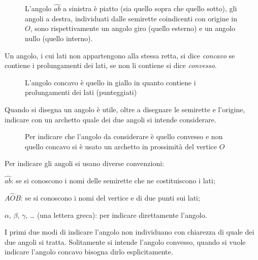 \begin{inaccessibleblock}
 \begin{figure}[bth]
 \centering 
 \caption{L'angolo  $\widehat{ab}$ a sinistra è piatto (sia quello 
sopra che quello sotto), gli angoli a destra, individuati dalle 
semirette coindicenti con origine in $O$, sono rispettivamente un 
angolo giro (quello esterno) e un angolo nullo (quello 
interno).}\label{fig:1.19}
\end{figure}
\end{inaccessibleblock}

\begin{definizione}
Un angolo, i cui lati non appartengono alla stessa retta, si dice 
\emph{concavo} se contiene i prolungamenti dei lati, se non li 
contiene si dice \emph{convesso}.
\end{definizione}

\begin{figure*}[htb]
\centering  
\caption{L'angolo concavo è quello in giallo in quanto contiene i 
prolungamenti dei lati (punteggiati)}\label{fig:1.20}
\end{figure*}

Quando si disegna un angolo è utile, oltre a disegnare le semirette e 
l'origine, indicare con un archetto quale dei due angoli si intende 
considerare.


\begin{inaccessibleblock}
 \begin{figure}[htb]
 \centering 
\caption{Per indicare che l'angolo da considerare è quello convesso e 
non quello concavo si è usato un archetto in prossimità del vertice 
$O$}\label{fig:1.21}
\end{figure}
\end{inaccessibleblock}

Per indicare gli angoli si usano diverse convenzioni:
\begin{itemize*}
\item  $\widehat{ab}$: se si conoscono i nomi delle semirette che ne 
costituiscono i lati;
\item  $A\widehat{O}B$: se si conoscono i nomi del vertice e di due 
punti sui lati;
\item  $\alpha$, $\beta$, $\gamma$, \ldots{} (una lettera greca): per 
indicare direttamente l'angolo.
\end{itemize*}
I primi due modi di indicare l'angolo non individuano con chiarezza 
di quale dei due angoli si tratta. Solitamente si intende l'angolo 
convesso, quando si vuole indicare l'angolo concavo bisogna dirlo 
esplicitamente.

